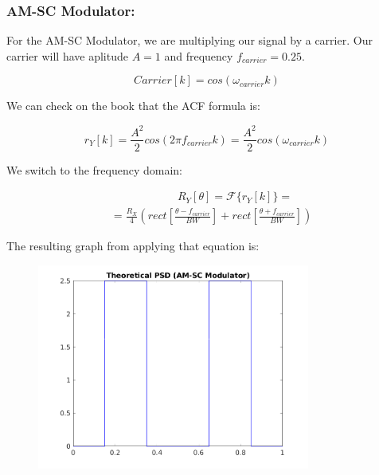 \documentclass[a4paper,11pt]{article}
\begin{document}
\newpage

\subsubsection{AM-SC Modulator:}

For the AM-SC Modulator, we are multiplying our signal by a carrier. Our
carrier will have aplitude $A = 1$ and frequency $f_{carrier} = 0.25$.

\begin{equation}\label{eq:carrier}
  Carrier[k] = cos(\omega_{carrier} k)
\end{equation}

We can check on the book that the ACF formula is:

\begin{equation}\label{eq:r_am}
  r_Y[k] = \frac{A^2}{2}cos(2\pi f_{carrier} k) =
  \frac{A^2}{2}cos(\omega_{carrier} k)
\end{equation}

We switch to the frequency domain:

\begin{equation}\label{eq:R_am}
  \begin{split}
  & \qquad\qquad\qquad R_Y[\theta] = \mathcal{F}\{r_Y[k]\} = \\
  & =\displaystyle\frac{R_X}{4}(rect[\frac{\theta - f_{carrier}}{BW}] +
  rect[\frac{\theta + f_{carrier}}{BW}])
  \end{split}
\end{equation}

The resulting graph from applying that equation is:

\begin{figure}[!hp]
    \begin{center}
      \includegraphics[width=0.8\textwidth]{images/study3/R_th_am.png}
    \end{center}
\end{figure}
\end{document}
